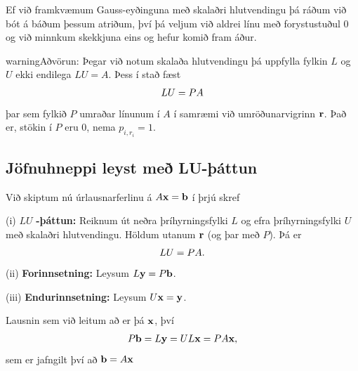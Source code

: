 \documentclass[letterpaper,10pt,icelandic]{sphinxmanual}
\begin{document}
Ef við framkvæmum Gauss-eyðinguna með skalaðri hlutvendingu þá ráðum við
bót á báðum þessum atriðum, því þá veljum við aldrei línu með
forystustuðul 0 og við minnkum skekkjuna eins og hefur komið fram áður.

\begin{notice}{warning}{Aðvörun:}
Þegar við notum skalaða hlutvendingu þá uppfylla fylkin \(L\) og
\(U\) ekki endilega \(LU=A\). Þess í stað
fæst
\begin{gather}
\begin{split}LU =PA\end{split}\notag
\end{gather}
þar sem fylkið \(P\) umraðar línunum í \(A\) í samræmi við
umröðunarvigrinn \(\mbox{${\bf r}$}\). Það er, stökin í \(P\)
eru 0, nema \(p_{i,r_i} = 1\).
\end{notice}


\subsection{Jöfnuhneppi leyst með LU-þáttun}
\label{kafli08:jofnuhneppi-leyst-me-lu-attun}\label{kafli08:index-19}
Við skiptum nú úrlausnarferlinu á
\(A\mbox{${\bf x}$}=\mbox{${\bf b}$}\) í þrjú skref

(i) \(LU\) \textbf{-þáttun:} Reiknum út neðra þríhyrningsfylki \(L\)
og efra þríhyrningsfylki \(U\) með skalaðri hlutvendingu. Höldum
utanum \(\mbox{${\bf r}$}\) (og þar með \(P\)). Þá er
\begin{gather}
\begin{split}LU=PA.\end{split}\notag
\end{gather}
(ii) \textbf{Forinnsetning:} Leysum
\(L\mbox{${\bf y}$}=P\mbox{${\bf b}$}\).

(iii) \textbf{Endurinnsetning:} Leysum
\(U\mbox{${\bf x}$}=\mbox{${\bf y}$}\).

Lausnin sem við leitum að er þá \(\mbox{${\bf x}$}\), því
\begin{gather}
\begin{split}P\mbox{${\bf b}$}= L\mbox{${\bf y}$}= UL\mbox{${\bf x}$}= PA\mbox{${\bf x}$},\end{split}\notag
\end{gather}
sem er jafngilt því að \(\mbox{${\bf b}$}=A\mbox{${\bf x}$}\)
\end{document}
